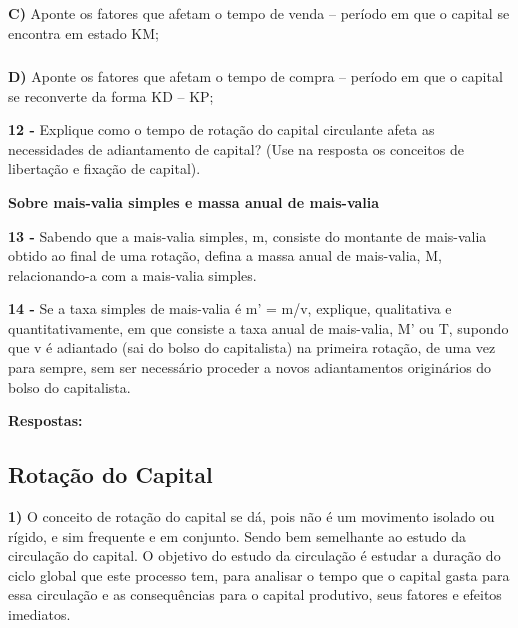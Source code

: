 \documentclass[a4paper, 12pt]{article} %
\begin{document}
\subparagraph{} \textbf{C)} Aponte os fatores que afetam o tempo de venda – período em que o capital se encontra em
estado KM;

\subparagraph{} \textbf{D)} Aponte os fatores que afetam o tempo de compra – período em que o capital se reconverte da
forma KD – KP;

\vspace{0.5cm}

\par \textbf{12 -} Explique como o tempo de rotação do capital circulante afeta as necessidades de adiantamento de
capital? (Use na resposta os conceitos de libertação e fixação de capital).

\vspace{0.5cm}
\begin{center}
	\textbf{Sobre mais-valia simples e massa anual de mais-valia}
\end{center}
\vspace{0.5cm}

\par \textbf{13 -} Sabendo que a mais-valia simples, m, consiste do montante de mais-valia obtido ao final de uma
rotação, defina a massa anual de mais-valia, M, relacionando-a com a mais-valia simples.

\vspace{0.5cm}

\par \textbf{14 -} Se a taxa simples de mais-valia é m’ = m/v, explique, qualitativa e quantitativamente, em que
consiste a taxa anual de mais-valia, M’ ou T, supondo que v é adiantado (sai do bolso do capitalista) na
primeira rotação, de uma vez para sempre, sem ser necessário proceder a novos adiantamentos
originários do bolso do capitalista.

\vspace{0.5cm}

\begin{center}
\textbf{Respostas:}
\end{center}


\begin{center}
\section{Rotação do Capital}
\end{center}


\par \textbf{1)} O conceito de rotação do capital se dá, pois não é um movimento isolado ou rígido, e sim frequente e em conjunto. Sendo bem semelhante ao estudo da circulação do capital. O objetivo do estudo da circulação é estudar a duração do ciclo global que este processo tem, para analisar o tempo que o capital gasta para essa circulação e as consequências para o capital produtivo, seus fatores e efeitos imediatos. 
\end{document}
